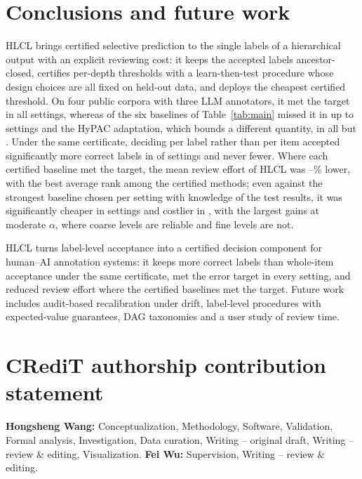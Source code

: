 \documentclass[preprint,12pt]{elsarticle}
\theoremstyle{definition}
\newcommand{\hlcl}{\textup{\textsc{HLCL}}}
\begin{document}
\section{Conclusions and future work}
\label{sec:conclusion}

\hlcl{} brings certified selective prediction to the single labels of a
hierarchical output with an explicit reviewing cost: it keeps the accepted
labels ancestor-closed, certifies per-depth thresholds with a learn-then-test
procedure whose design choices are all fixed on held-out data, and deploys the
cheapest certified threshold. On four public corpora with three LLM annotators,
it met the target in all  settings, whereas
 of the six baselines of Table~\ref{tab:main} missed it in
up to  settings and the HyPAC adaptation, which bounds a
different quantity, in all but . Under the same certificate,
deciding per label rather than per item accepted significantly more correct
labels in  of  settings and never
fewer. Where each certified baseline met the target, the mean review effort of
\hlcl{} was --\% lower, with the best
average rank among the certified methods; even against the strongest baseline
chosen per setting with knowledge of the test results, it was significantly
cheaper in  settings and costlier in , with the
largest gains at moderate $\alpha$, where coarse levels are reliable and fine
levels are not.

\hlcl{} turns label-level acceptance into a certified decision component for
human--AI annotation systems: it keeps more correct labels than whole-item
acceptance under the same certificate, met the error target in every setting,
and reduced review effort where the certified baselines met the target. Future
work includes audit-based recalibration under drift, label-level procedures
with expected-value guarantees, DAG taxonomies and a user study of review time.


\section*{CRediT authorship contribution statement}
\textbf{Hongsheng Wang:} Conceptualization, Methodology, Software, Validation,
Formal analysis, Investigation, Data curation, Writing -- original draft,
Writing -- review \& editing, Visualization. \textbf{Fei Wu:} Supervision,
Writing -- review \& editing.
\end{document}
